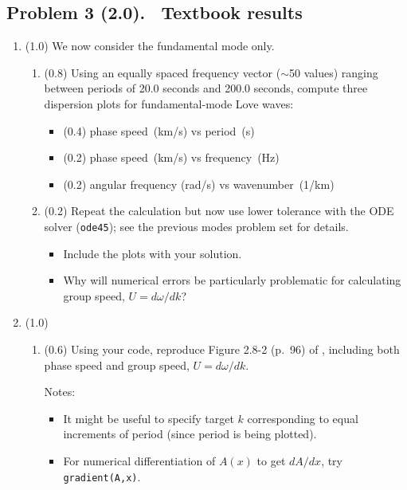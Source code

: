 \documentclass[11pt,titlepage,fleqn]{article}
\begin{document}

\subsection*{Problem 3 (2.0). \ptag\ Textbook results}

\begin{enumerate}

\item (1.0) We now consider the fundamental mode only.

\begin{enumerate}
\item (0.8) Using an equally spaced frequency vector ($\sim$50 values) ranging between periods of 20.0 seconds and 200.0 seconds, compute three dispersion plots for fundamental-mode Love waves:
%
\begin{itemize}
\item (0.4) phase speed~(km/s) vs period~(s)
\item (0.2) phase speed~(km/s) vs frequency~(Hz)
\item (0.2) angular frequency (rad/s) vs wavenumber~(1/km)
\end{itemize}

\item (0.2) Repeat the calculation but now use lower tolerance with the ODE solver (\verb+ode45+); see the previous modes problem set for details.
%
\begin{itemize}
\item Include the plots with your solution.
\item Why will numerical errors be particularly problematic for calculating group speed, $U = d\omega/dk$?
\end{itemize}

\end{enumerate}


\item (1.0)
%
\begin{enumerate}
\item (0.6) Using your code, reproduce Figure 2.8-2 (p.~96) of \citet{SteinWysession}, including both phase speed and group speed, $U = d\omega/dk$.

Notes:
%
\begin{itemize}
\item It might be useful to specify target $k$ corresponding to equal increments of period (since period is being plotted).
\item For numerical differentiation of $A(x)$ to get $dA/dx$, try \verb+gradient(A,x)+.
\end{itemize}


\end{enumerate}
\end{enumerate}
\end{document}
